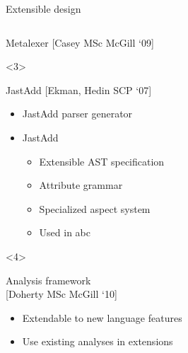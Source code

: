 \begin{frame}[t]{Extensible design}
\begin{columns}[T]
\begin{column}{5cm}
\begin{onlyenv}
\begin{block}{Metalexer {\tiny[Casey MSc McGill `09]}
          \vspace{1ex}}
        \end{block}
      \end{onlyenv}
      \begin{onlyenv}<3>
        \begin{block}{JastAdd {\tiny[Ekman, Hedin SCP `07]}}
          \begin{itemize}
          \item JastAdd parser generator
          \item JastAdd 
            \begin{itemize}
            \item Extensible AST specification
            \item Attribute grammar
            \item Specialized aspect system
            \item Used in abc
            \end{itemize}
          \end{itemize}
        \end{block}
      \end{onlyenv}
      \begin{onlyenv}<4>
        \begin{block}{Analysis framework \\{\tiny[Doherty MSc McGill `10]}}
          \begin{itemize}
          \item Extendable to new language features
          \item Use existing analyses in extensions
          \end{itemize}
        \end{block}
      \end{onlyenv}
    \end{column}
  \end{columns}
\end{frame}
